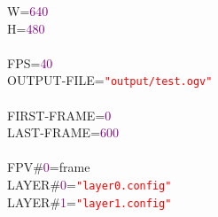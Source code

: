 \noindent
\mbox{}W\textcolor{BrickRed}{=}\textcolor{Purple}{640} \\
\mbox{}H\textcolor{BrickRed}{=}\textcolor{Purple}{480} \\
\mbox{} \\
\mbox{}FPS\textcolor{BrickRed}{=}\textcolor{Purple}{40} \\
\mbox{}OUTPUT\textcolor{BrickRed}{-}FILE\textcolor{BrickRed}{=}\texttt{\textcolor{Red}{"{}output/test.ogv"{}}} \\
\mbox{} \\
\mbox{}FIRST\textcolor{BrickRed}{-}FRAME\textcolor{BrickRed}{=}\textcolor{Purple}{0} \\
\mbox{}LAST\textcolor{BrickRed}{-}FRAME\textcolor{BrickRed}{=}\textcolor{Purple}{600} \\
\mbox{} \\
\mbox{}FPV\#\textcolor{Purple}{0}\textcolor{BrickRed}{=}frame \\
\mbox{}LAYER\#\textcolor{Purple}{0}\textcolor{BrickRed}{=}\texttt{\textcolor{Red}{"{}layer0.config"{}}} \\
\mbox{}LAYER\#\textcolor{Purple}{1}\textcolor{BrickRed}{=}\texttt{\textcolor{Red}{"{}layer1.config"{}}} \\
\mbox{}
